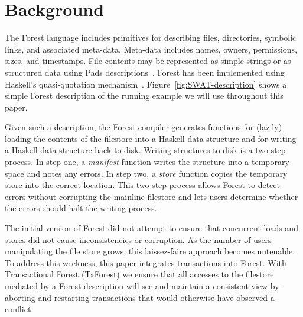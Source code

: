 \section{Background}
\label{sec:Background}


The Forest language includes primitives for describing files,
directories, symbolic links, and associated meta-data.  Meta-data
includes names, owners, permissions, sizes, and timestamps.  File
contents may be represented as simple strings or as structured data
using Pads descriptions~\cite{fisher+:pads,fisher-walker:icdt}. Forest has been implemented using
Haskell's quasi-quotation mechanism~\cite{Mainland:quasi}.
Figure~\ref{fig:SWAT-description} shows a simple Forest
description of the running example we will use throughout this paper.

Given such a description, the Forest compiler generates functions for
(lazily) loading the contents of the filestore into a Haskell data
structure and for writing a Haskell data structure back to disk.
Writing structures to disk is a two-step process.  In step one, a
\textit{manifest} function writes the structure into a temporary space
and notes any errors.  In step two, a \textit{store} function copies
the temporary store into the correct location.  This two-step process
allows Forest to detect errors without corrupting the mainline
filestore and lets users determine whether the errors should halt the
writing process.

The initial version of Forest did not attempt to ensure that 
concurrent loads and stores did not cause inconsistencies or
corruption.  As the number of users manipulating the file store grows,
this laissez-faire approach becomes untenable.  To address this
weekness, this paper integrates transactions into Forest.  With
Transactional Forest (TxForest) we ensure that all accesses to the
filestore mediated by a Forest description will see and maintain a
consistent view by aborting and restarting transactions that would
otherwise have observed a conflict.

